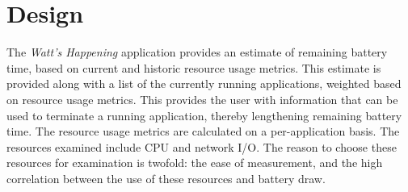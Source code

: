 \section{Design}
\label{sec:design}
% 


The \emph{Watt's Happening} application provides an estimate of remaining battery time, based on current and historic resource usage metrics. 
This estimate is provided along with a list of the currently running applications, weighted based on resource usage metrics.  
This provides the user with information that can be used to terminate a running application, thereby lengthening remaining battery time.
The resource usage metrics are calculated on a per-application basis.
The resources examined include CPU and network I/O.
The reason to choose these resources for examination is twofold: the ease of measurement, and the high correlation between the use of these resources and battery draw.

